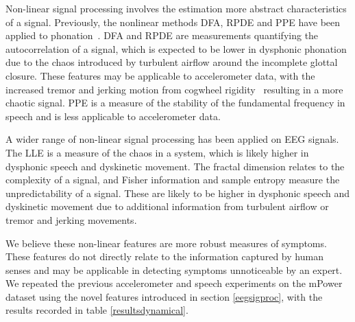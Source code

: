 \documentclass[12pt, twoside]{book}
\begin{document}
Non-linear signal processing involves the estimation more abstract characteristics of a signal. Previously, the nonlinear methods DFA, RPDE and PPE have been applied to phonation~\cite{splittlenonlinear2007,splittledysphonia2009}. DFA and RPDE are measurements quantifying the autocorrelation of a signal, which is expected to be lower in dysphonic phonation due to the chaos introduced by turbulent airflow around the incomplete glottal closure. These features may be applicable to accelerometer data, with the increased tremor and jerking motion from cogwheel rigidity~\cite{cogwheel} resulting in a more chaotic signal. PPE is a measure of the stability of the fundamental frequency in speech and is less applicable to accelerometer data.

A wider range of non-linear signal processing has been applied on EEG signals. The LLE is a measure of the chaos in a system, which is likely higher in dysphonic speech and dyskinetic movement. The fractal dimension relates to the complexity of a signal, and Fisher information and sample entropy measure the unpredictability of a signal. These are likely to be higher in dysphonic speech and dyskinetic movement due to additional information from turbulent airflow or tremor and jerking movements. 

We believe these non-linear features are more robust measures of symptoms. These features do not directly relate to the information captured by human senses and may be applicable in detecting symptoms unnoticeable by an expert. We repeated the previous accelerometer and speech experiments on the mPower dataset using the novel features introduced in section \ref{eegsigproc}, with the results recorded in table \ref{resultsdynamical}.
\end{document}

